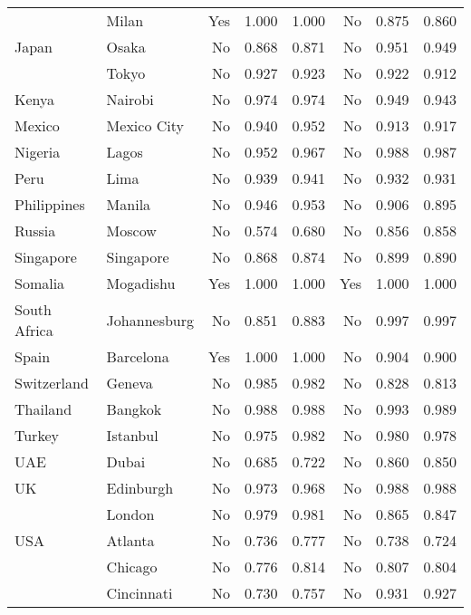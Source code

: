 \begin{tabular}{ l l r r r r r r  }
          & Milan &      Yes &  1.000 &  1.000 &       No &  0.875 &  0.860 \\
Japan & Osaka &       No &  0.868 &  0.871 &       No &  0.951 &  0.949 \\
          & Tokyo &       No &  0.927 &  0.923 &       No &  0.922 &  0.912 \\
Kenya & Nairobi &       No &  0.974 &  0.974 &       No &  0.949 &  0.943 \\
Mexico & Mexico City &       No &  0.940 &  0.952 &       No &  0.913 &  0.917 \\
Nigeria & Lagos &       No &  0.952 &  0.967 &       No &  0.988 &  0.987 \\
Peru & Lima &       No &  0.939 &  0.941 &       No &  0.932 &  0.931 \\
Philippines & Manila &       No &  0.946 &  0.953 &       No &  0.906 &  0.895 \\
Russia & Moscow &       No &  0.574 &  0.680 &       No &  0.856 &  0.858 \\
Singapore & Singapore &       No &  0.868 &  0.874 &       No &  0.899 &  0.890 \\
Somalia & Mogadishu &      Yes &  1.000 &  1.000 &      Yes &  1.000 &  1.000 \\
South Africa & Johannesburg &       No &  0.851 &  0.883 &       No &  0.997 &  0.997 \\
Spain & Barcelona &      Yes &  1.000 &  1.000 &       No &  0.904 &  0.900 \\
Switzerland & Geneva &       No &  0.985 &  0.982 &       No &  0.828 &  0.813 \\
Thailand & Bangkok &       No &  0.988 &  0.988 &       No &  0.993 &  0.989 \\
Turkey & Istanbul &       No &  0.975 &  0.982 &       No &  0.980 &  0.978 \\
UAE & Dubai &       No &  0.685 &  0.722 &       No &  0.860 &  0.850 \\
UK & Edinburgh &       No &  0.973 &  0.968 &       No &  0.988 &  0.988 \\
          & London &       No &  0.979 &  0.981 &       No &  0.865 &  0.847 \\
USA & Atlanta &       No &  0.736 &  0.777 &       No &  0.738 &  0.724 \\
          & Chicago &       No &  0.776 &  0.814 &       No &  0.807 &  0.804 \\
          & Cincinnati &       No &  0.730 &  0.757 &       No &  0.931 &  0.927 \\

\end{tabular}
